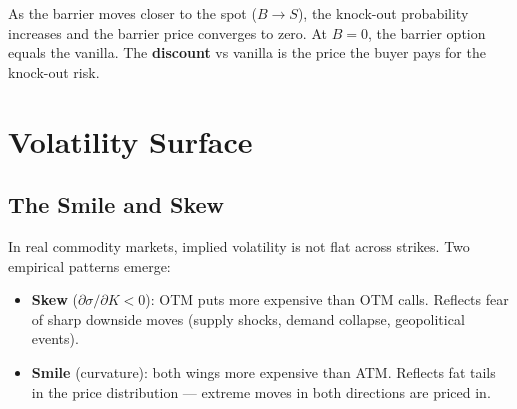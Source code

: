 \documentclass[11pt,a4paper]{article}
\begin{document}
\begin{center}
\end{center}

As the barrier moves closer to the spot ($B\to S$), the knock-out probability
increases and the barrier price converges to zero. At $B=0$, the barrier option
equals the vanilla. The \textbf{discount} vs vanilla is the price the buyer pays
for the knock-out risk.

\section{Volatility Surface}

\subsection{The Smile and Skew}

In real commodity markets, implied volatility is not flat across strikes.
Two empirical patterns emerge:

\begin{itemize}[itemsep=3pt]
\item \textbf{Skew} ($\partial\sigma/\partial K < 0$): OTM puts more expensive
      than OTM calls. Reflects fear of sharp downside moves (supply shocks,
      demand collapse, geopolitical events).
\item \textbf{Smile} (curvature): both wings more expensive than ATM. Reflects
      fat tails in the price distribution --- extreme moves in both directions
      are priced in.
\end{itemize}
\end{document}
